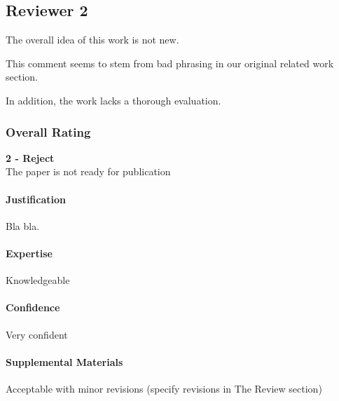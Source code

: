 \subsection{Reviewer 2} \label{sec:rev:2}

The overall idea of this work is not new. 

\begin{response} \label{res:rev2:related}
This comment seems to stem from bad phrasing in our original related work section. 
\end{response}

In addition, the work lacks a thorough evaluation.

\subsubsection*{Overall Rating}
\textbf{2 - Reject} \\
The paper is not ready for publication

\paragraph{Justification}
Bla bla.

\paragraph{Expertise}
Knowledgeable

\paragraph{Confidence}
Very confident

\paragraph{Supplemental Materials}
Acceptable with minor revisions (specify revisions in The Review section)
